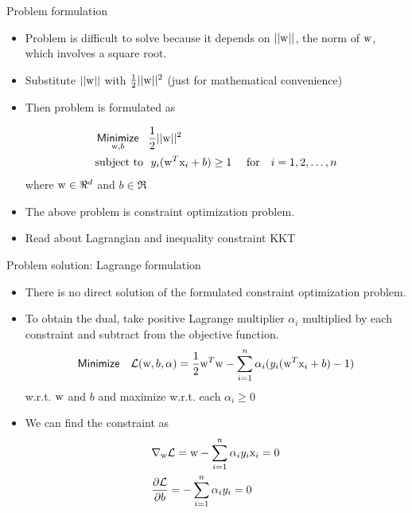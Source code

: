 \begin{frame}{Problem formulation}
\begin{itemize}

\item Problem is difficult to solve because it depends on $||{\rm w}||$, the norm of ${\rm w}$, which involves a square root.
\item Substitute $||{\rm w}||$ with $\frac{1}{2}||{\rm w}||^2$ (just for mathematical convenience)
\item Then problem is formulated as

\begin{align*}
&\mathop{\sf Minimize}\limits_{{\rm w},b}~~\frac{1}{2}||{\rm w}||^2\\
&\text{subject to}~~y_i( {{{\rm w}^T}{{\rm x}_i} + b} ) \geq 1~~~~\text{for}~~~i=1,2,\ldots,n
\end{align*}
where ${\rm w}\in \Re^d$ and $b\in \Re$
\item The above problem is {\color{mycolor1}constraint optimization problem}.
\item {\color{mycolor2}Read about Lagrangian and inequality constraint KKT}\nocite{duda2012pattern}
\end{itemize}
\end{frame}


\begin{frame}{Problem solution: Lagrange formulation}
\begin{itemize}
\item There is {\color{mycolor2}no direct solution} of the formulated constraint optimization problem.
\item To obtain the dual, take positive Lagrange multiplier $\alpha_i$ multiplied by each constraint and subtract from the objective function.
\[{\sf Minimize}~~~\mathcal{L}({\rm w},b,\alpha)=\frac{1}{2}{\rm w}^T{\rm w} -\sum_{i=1}^{n} \alpha_i (y_i({\rm w}^T{\rm x}_i+b)-1)\]
w.r.t. ${\rm w}$ and $b$ and maximize w.r.t. each $\alpha_{i}\geq 0$
\item We can find the constraint as
\[\begin{gathered}
  {\nabla _{\rm w}}\mathcal{L} = {\rm w} - \sum\limits_{i = 1}^n {{\alpha _i}{y_i}{{\rm x}_i} = 0}  \hfill \\
  \frac{{\partial \mathcal{L}}}{{\partial b}} =  - \sum\limits_{i = 1}^n {{\alpha _i}{y_i} = 0}  \hfill \\ 
\end{gathered} \]
\end{itemize}
\end{frame}


